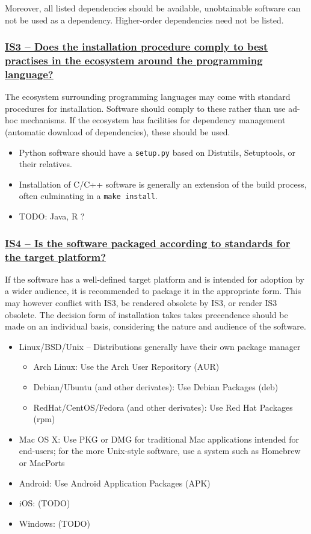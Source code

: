 \documentclass[a4paper,11pt]{article}
\newcommand{\indicator}[1]{\subsubsection*{\underline{#1}}}
\begin{document}
Moreover, all listed dependencies should be available, unobtainable software
can not be used as a dependency. Higher-order dependencies need not be listed.

\indicator{IS3 -- Does the installation procedure comply to best practises
in the ecosystem around the programming language?}

The ecosystem surrounding programming languages may come with standard
procedures for installation. Software should comply to these rather than use
ad-hoc mechanisms. If the ecosystem has facilities for dependency management
(automatic download of dependencies), these should be used.

\begin{itemize}
 \item Python software should have a \texttt{setup.py} based on Distutils,
     Setuptools, or their relatives.
 \item Installation of C/C++ software is generally an extension of the build
     process, often culminating in a \texttt{make install}.
 \item TODO: Java, R ?
\end{itemize}

\indicator{IS4 -- Is the software packaged according to standards for the target platform?}

If the software has a well-defined target platform and is intended for adoption
by a wider audience, it is recommended to package it in the appropriate form.
This may however conflict with IS3, be rendered obsolete by IS3, or render IS3
obsolete. The decision form of installation takes takes precendence should be
made on an individual basis, considering the nature and audience of the
software.

\begin{itemize}
    \item Linux/BSD/Unix -- Distributions generally have their own package manager
    \begin{itemize}
        \item Arch Linux: Use the Arch User Repository (AUR)
        \item Debian/Ubuntu (and other derivates): Use Debian Packages (deb)
        \item RedHat/CentOS/Fedora (and other derivates): Use Red Hat Packages (rpm)
    \end{itemize}
    \item Mac OS X: Use PKG or DMG for traditional Mac applications intended for end-users; for the more Unix-style
        software, use a system such as Homebrew or MacPorts
    \item Android: Use Android Application Packages (APK)
    \item iOS: (TODO) 
    \item Windows: (TODO) 
\end{itemize}
\end{document}

